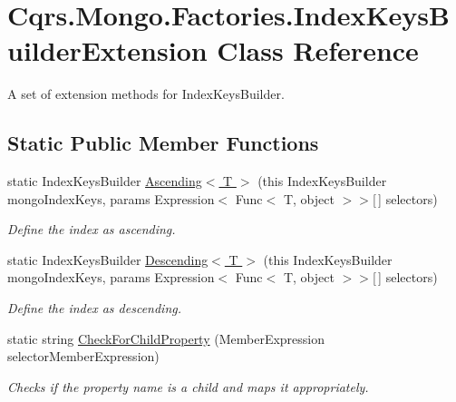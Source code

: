 \hypertarget{classCqrs_1_1Mongo_1_1Factories_1_1IndexKeysBuilderExtension}{}\section{Cqrs.\+Mongo.\+Factories.\+Index\+Keys\+Builder\+Extension Class Reference}
\label{classCqrs_1_1Mongo_1_1Factories_1_1IndexKeysBuilderExtension}


A set of extension methods for Index\+Keys\+Builder.  


\subsection*{Static Public Member Functions}
\begin{DoxyCompactItemize}
\item 
static Index\+Keys\+Builder \hyperlink{classCqrs_1_1Mongo_1_1Factories_1_1IndexKeysBuilderExtension_a7c8f1f6e1477161509f8e9ac3ba1d8d9_a7c8f1f6e1477161509f8e9ac3ba1d8d9}{Ascending$<$ T $>$} (this Index\+Keys\+Builder mongo\+Index\+Keys, params Expression$<$ Func$<$ T, object $>$$>$\mbox{[}$\,$\mbox{]} selectors)
\begin{DoxyCompactList}\small\item\em Define the index as ascending. \end{DoxyCompactList}\item 
static Index\+Keys\+Builder \hyperlink{classCqrs_1_1Mongo_1_1Factories_1_1IndexKeysBuilderExtension_a9b2a712a921c4b5aea720a56eecb7643_a9b2a712a921c4b5aea720a56eecb7643}{Descending$<$ T $>$} (this Index\+Keys\+Builder mongo\+Index\+Keys, params Expression$<$ Func$<$ T, object $>$$>$\mbox{[}$\,$\mbox{]} selectors)
\begin{DoxyCompactList}\small\item\em Define the index as descending. \end{DoxyCompactList}\item 
static string \hyperlink{classCqrs_1_1Mongo_1_1Factories_1_1IndexKeysBuilderExtension_ab380ab44ca3970fb1e5a4c40e429b444_ab380ab44ca3970fb1e5a4c40e429b444}{Check\+For\+Child\+Property} (Member\+Expression selector\+Member\+Expression)
\begin{DoxyCompactList}\small\item\em Checks if the property name is a child and maps it appropriately. \end{DoxyCompactList}\end{DoxyCompactItemize}


